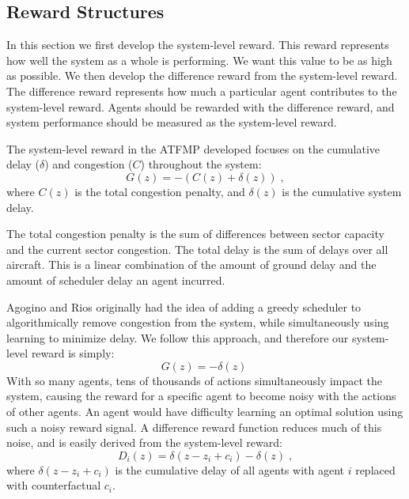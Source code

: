 \documentclass[letterpaper]{article}
\begin{document}
 

\subsection{Reward Structures}

In this section we first develop the system-level reward. This reward represents how well the system as a whole is performing. We want this value to be as high as possible. We then develop the difference reward from the system-level reward. The difference reward represents how much a particular agent contributes to the system-level reward. Agents should be rewarded with the difference reward, and system performance should be measured as the system-level reward. 

The system-level reward in the ATFMP developed focuses on the cumulative delay ($\delta$) and congestion ($C$) throughout the system:
%
\begin{equation} \label{eq:Global}
G(z) = -(C(z) + \delta(z))\;,
\end{equation}
%
where $C(z)$ is the total congestion penalty, and $\delta(z)$ is the cumulative system delay.

The total congestion penalty is the sum of differences between sector capacity and the current sector congestion. The total delay is the sum of delays over all aircraft. This is a linear combination of the amount of ground delay and the amount of scheduler delay an agent incurred.

Agogino and Rios originally had the idea of adding a greedy scheduler to algorithmically remove congestion from the system, while simultaneously using learning to minimize delay. We follow this approach, and therefore our system-level reward is simply:
%
\begin{equation} \label{eq:Global}
G(z) = -\delta(z)\;
\end{equation}
%
With so many agents, tens of thousands of actions simultaneously impact the system, causing the reward for a specific agent to become noisy with the actions of other agents. An agent would have difficulty learning an optimal solution using such a noisy reward signal. A difference reward function reduces much of this noise, and is easily derived from the system-level reward:
%
\begin{equation}
D_i(z) = \delta(z-z_i + c_i) - \delta(z)\;,
\end{equation}
%
where \textit{$\delta(z-z_i + c_i)$} is the cumulative delay of all agents with agent $i$ replaced with counterfactual \textit{$c_i$}.
\end{document}

